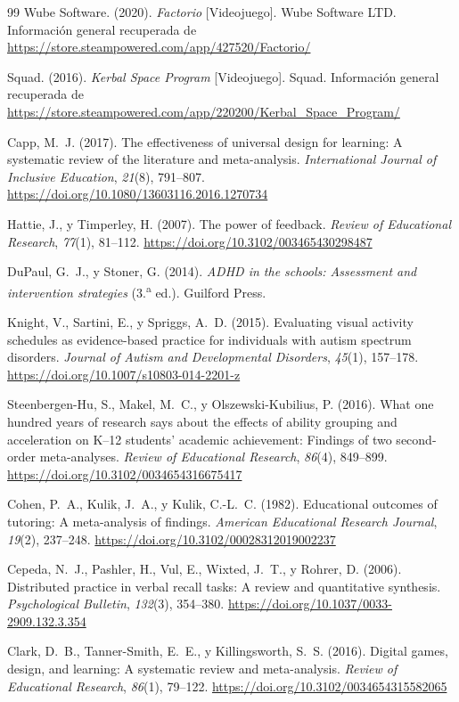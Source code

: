 \documentclass[a4paper,12pt]{article}
\begin{document}
\begin{thebibliography}{99}
Wube Software. (2020). \textit{Factorio} [Videojuego]. Wube Software LTD. Información general recuperada de \url{https://store.steampowered.com/app/427520/Factorio/}

Squad. (2016). \textit{Kerbal Space Program} [Videojuego]. Squad. Información general recuperada de \url{https://store.steampowered.com/app/220200/Kerbal_Space_Program/}

Capp, M.~J. (2017). The effectiveness of universal design for learning: A systematic review of the literature and meta-analysis. \textit{International Journal of Inclusive Education}, \textit{21}(8), 791--807. \url{https://doi.org/10.1080/13603116.2016.1270734}

Hattie, J., y Timperley, H. (2007). The power of feedback. \textit{Review of Educational Research}, \textit{77}(1), 81--112. \url{https://doi.org/10.3102/003465430298487}

DuPaul, G.~J., y Stoner, G. (2014). \textit{ADHD in the schools: Assessment and intervention strategies} (3.\textsuperscript{a} ed.). Guilford Press.

Knight, V., Sartini, E., y Spriggs, A.~D. (2015). Evaluating visual activity schedules as evidence-based practice for individuals with autism spectrum disorders. \textit{Journal of Autism and Developmental Disorders}, \textit{45}(1), 157--178. \url{https://doi.org/10.1007/s10803-014-2201-z}

Steenbergen-Hu, S., Makel, M.~C., y Olszewski-Kubilius, P. (2016). What one hundred years of research says about the effects of ability grouping and acceleration on K--12 students' academic achievement: Findings of two second-order meta-analyses. \textit{Review of Educational Research}, \textit{86}(4), 849--899. \url{https://doi.org/10.3102/0034654316675417}

Cohen, P.~A., Kulik, J.~A., y Kulik, C.-L.~C. (1982). Educational outcomes of tutoring: A meta-analysis of findings. \textit{American Educational Research Journal}, \textit{19}(2), 237--248. \url{https://doi.org/10.3102/00028312019002237}

Cepeda, N.~J., Pashler, H., Vul, E., Wixted, J.~T., y Rohrer, D. (2006). Distributed practice in verbal recall tasks: A review and quantitative synthesis. \textit{Psychological Bulletin}, \textit{132}(3), 354--380. \url{https://doi.org/10.1037/0033-2909.132.3.354}

Clark, D.~B., Tanner-Smith, E.~E., y Killingsworth, S.~S. (2016). Digital games, design, and learning: A systematic review and meta-analysis. \textit{Review of Educational Research}, \textit{86}(1), 79--122. \url{https://doi.org/10.3102/0034654315582065}

\end{thebibliography}
\newpage
\end{document}
